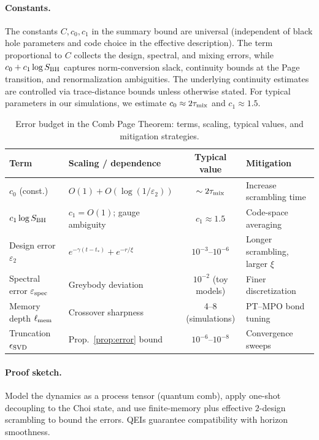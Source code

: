 \documentclass[a4paper,11pt]{article}
\theoremstyle{plain}
\theoremstyle{definition}
\theoremstyle{remark}
\begin{document}
\paragraph{Constants.}
The constants $C,c_0,c_1$ in the summary bound are universal (independent of black hole parameters and code choice in the effective description). The term proportional to $C$ collects the design, spectral, and mixing errors, while $c_0+c_1\log S_{\rm BH}$ captures norm-conversion slack, continuity bounds at the Page transition, and renormalization ambiguities. The underlying continuity estimates are controlled via trace-distance bounds unless otherwise stated. For typical parameters in our simulations, we estimate $c_0 \approx 2\tau_{\rm mix}$ and $c_1 \approx 1.5$.

\begin{table}[tbp]
\centering
\caption{Error budget in the Comb Page Theorem: terms, scaling, typical values, and mitigation strategies.}
\label{tab:error_budget}
\footnotesize
\begin{tabularx}{\linewidth}{@{}l Y c Y@{}}
\toprule
\textbf{Term} & \textbf{Scaling / dependence} & \textbf{Typical value} & \textbf{Mitigation} \\
\midrule
\(c_0\) (const.) & \(O(1) + O(\log(1/\varepsilon_2))\) & \(\sim 2\tau_{\rm mix}\) & Increase scrambling time \\
\(c_1\log S_{\rm BH}\) & \(c_1=O(1)\); gauge ambiguity & \(c_1 \approx 1.5\) & Code-space averaging \\
Design error \(\varepsilon_2\) & \(e^{-\gamma (t-t_\ast)} + e^{-r/\xi}\) & \(10^{-3}\)--\(10^{-6}\) & Longer scrambling, larger \(\xi\) \\
Spectral error \(\varepsilon_{\rm spec}\) & Greybody deviation & \(10^{-2}\) (toy models) & Finer discretization \\
Memory depth \(\ell_{\rm mem}\) & Crossover sharpness & 4--8 (simulations) & PT--MPO bond tuning \\
Truncation \(\epsilon_{\rm SVD}\) & Prop.~\ref{prop:error} bound & \(10^{-6}\)--\(10^{-8}\) & Convergence sweeps \\
\bottomrule
\end{tabularx}
\end{table}

\paragraph{Proof sketch.}
Model the dynamics as a process tensor (quantum comb), apply one-shot decoupling to the
Choi state, and use finite-memory plus effective \(2\)-design scrambling to bound the
errors.  QEIs guarantee compatibility with horizon smoothness.
\end{document}
